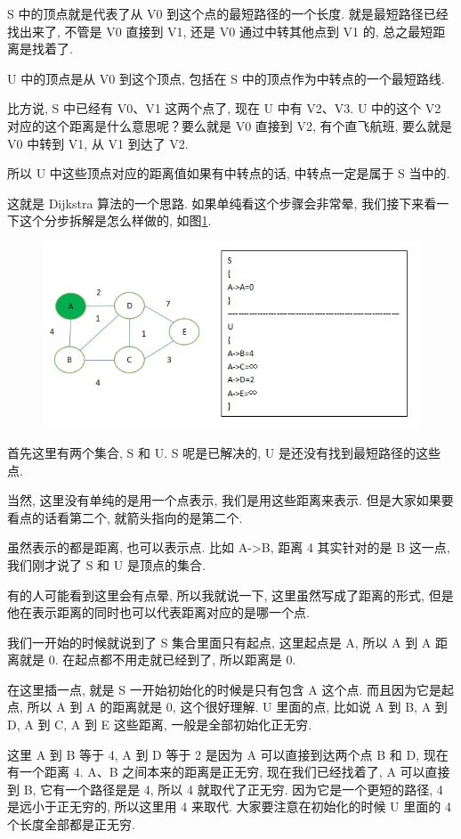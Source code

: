 S 中的顶点就是代表了从 V0 到这个点的最短路径的一个长度. 就是最短路径已经找出来了, 不管是 V0 直接到 V1, 还是 V0 通过中转其他点到 V1 的, 总之最短距离是找着了. 

U 中的顶点是从 V0 到这个顶点, 包括在 S 中的顶点作为中转点的一个最短路线. 

比方说, S 中已经有 V0、V1 这两个点了, 现在 U 中有 V2、V3. U 中的这个 V2 对应的这个距离是什么意思呢？要么就是 V0 直接到 V2, 有个直飞航班, 要么就是 V0 中转到 V1, 从 V1 到达了 V2. 

所以 U 中这些顶点对应的距离值如果有中转点的话, 中转点一定是属于 S 当中的. 

这就是 Dijkstra 算法的一个思路. 如果单纯看这个步骤会非常晕, 我们接下来看一下这个分步拆解是怎么样做的, 如图\ref{fig:img26_3}. 

\begin{figure}[ht]
  \centering
  \includegraphics[width=0.7\linewidth]{asset/20230924051222.jpg}
  \caption{}
  \label{fig:img26_3}
\end{figure}

首先这里有两个集合, S 和 U.  S 呢是已解决的, U 是还没有找到最短路径的这些点. 

当然, 这里没有单纯的是用一个点表示, 我们是用这些距离来表示. 但是大家如果要看点的话看第二个, 就箭头指向的是第二个. 

虽然表示的都是距离, 也可以表示点. 比如 A->B, 距离 4 其实针对的是 B 这一点, 我们刚才说了 S 和 U 是顶点的集合. 

有的人可能看到这里会有点晕, 所以我就说一下, 这里虽然写成了距离的形式, 但是他在表示距离的同时也可以代表距离对应的是哪一个点. 

我们一开始的时候就说到了 S 集合里面只有起点, 这里起点是 A, 所以 A 到 A 距离就是 0. 在起点都不用走就已经到了, 所以距离是 0. 

在这里插一点, 就是 S 一开始初始化的时候是只有包含 A 这个点. 而且因为它是起点, 所以 A 到 A 的距离就是 0, 这个很好理解. U 里面的点, 比如说 A 到 B, A 到 D, A 到 C, A 到 E 这些距离, 一般是全部初始化正无穷. 

这里 A 到 B 等于 4, A 到 D 等于 2 是因为 A 可以直接到达两个点 B 和 D, 现在有一个距离 4. A、B 之间本来的距离是正无穷, 现在我们已经找着了, A 可以直接到 B, 它有一个路径是是 4, 所以 4 就取代了正无穷. 因为它是一个更短的路径, 4 是远小于正无穷的, 所以这里用 4 来取代. 大家要注意在初始化的时候 U 里面的 4 个长度全部都是正无穷. 

